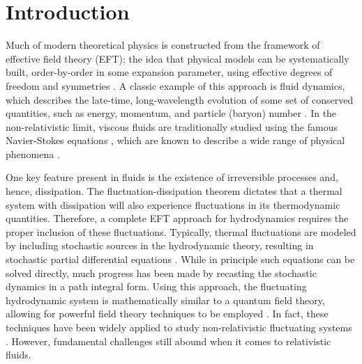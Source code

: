 \documentclass[aps,prd,nofootinbib,amsmath,amssymb,showpacs,longbibliography,singlecolumn,superscriptaddress,notitlepage]{revtex4-1}
\theoremstyle{plain}
\theoremstyle{definition}
\begin{document}
\maketitle

\section{Introduction}

Much of modern theoretical physics is constructed from the framework of effective field theory (EFT); the idea that physical models can be systematically built, order-by-order in some expansion parameter, using  effective degrees of freedom and symmetries \cite{Weinberg:1995mt, Weinberg:1996kr}. A classic example of this approach is fluid dynamics, which describes the late-time, long-wavelength evolution of some set of conserved quantities, such as energy, momentum, and particle (baryon) number \cite{Landau1987Fluid}. In the non-relativistic limit, viscous fluids are traditionally studied using the famous Navier-Stokes equations \cite{Landau1987Fluid}, which are known to describe a wide range of physical phenomena \cite{Alfvn1942ExistenceOE,pope_2000}. 

One key feature present in fluids is the existence of irreversible processes and, hence, dissipation. The fluctuation-dissipation theorem \cite{Callen:1951vq, Kubo:1957mj} dictates that a thermal system with dissipation will also experience fluctuations in its thermodynamic quantities. Therefore, a complete EFT approach for hydrodynamics requires the proper inclusion of these fluctuations. Typically, thermal fluctuations are modeled by including stochastic sources in the hydrodynamic theory, resulting in stochastic partial differential equations \cite{landau_statistical_part_II}. While in principle such equations can be solved directly, much progress has been made by recasting the stochastic dynamics in a path integral form. Using this approach, the fluctuating hydrodynamic system is mathematically similar to a quantum field theory, allowing for powerful field theory techniques to be employed \cite{Baym:1961zz, Schwinger:1960qe, Keldysh:1964ud, Martin:1973zz, Zinn-Justin:572813}. In fact, these techniques have been widely applied to study non-relativistic fluctuating systems \cite{weiss2008quantum}. However, fundamental challenges still abound when it comes to relativistic fluids.
\end{document}
